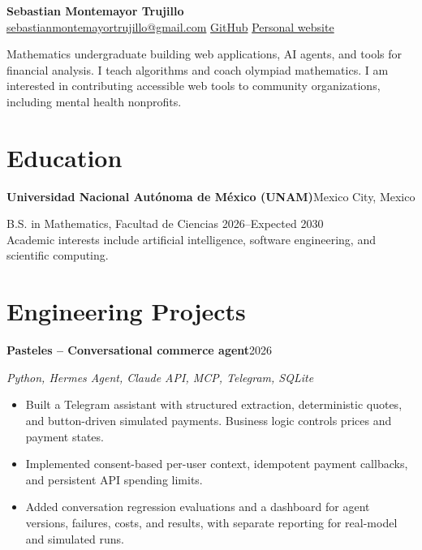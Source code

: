 \documentclass[11pt,letterpaper]{article}
\newcommand{\entry}[2]{\textbf{#1}\hfill #2\par}
\begin{document}
\begin{center}
{\LARGE\bfseries\color{ink} Sebastian Montemayor Trujillo}\\[5pt]
\href{mailto:sebastianmontemayortrujillo@gmail.com}{sebastianmontemayortrujillo@gmail.com}
\enspace\textbar\enspace
\href{https://github.com/SebastianMontemayorTrujillo}{GitHub}
\enspace\textbar\enspace
\href{https://sebastianmontemayortrujillo.github.io/}{Personal website}
\end{center}

Mathematics undergraduate building web applications, AI agents, and tools for financial analysis. I teach algorithms and coach olympiad mathematics. I am interested in contributing accessible web tools to community organizations, including mental health nonprofits.

\section*{Education}
\entry{Universidad Nacional Autónoma de México (UNAM)}{Mexico City, Mexico}
B.S. in Mathematics, Facultad de Ciencias \hfill 2026--Expected 2030\\
Academic interests include artificial intelligence, software engineering, and scientific computing.

\section*{Engineering Projects}
\entry{Pasteles -- Conversational commerce agent}{2026}
\textit{Python, Hermes Agent, Claude API, MCP, Telegram, SQLite}
\begin{itemize}
\item Built a Telegram assistant with structured extraction, deterministic quotes, and button-driven simulated payments. Business logic controls prices and payment states.
\item Implemented consent-based per-user context, idempotent payment callbacks, and persistent API spending limits.
\item Added conversation regression evaluations and a dashboard for agent versions, failures, costs, and results, with separate reporting for real-model and simulated runs.
\end{itemize}
\end{document}
